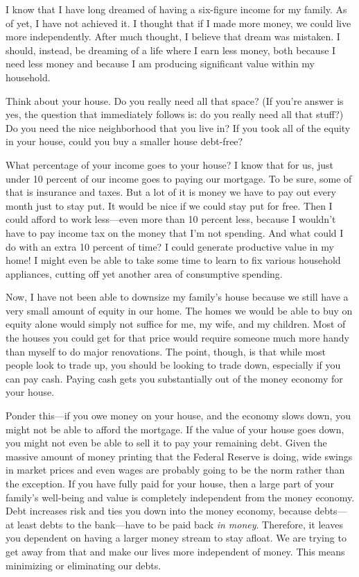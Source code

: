 I know that I have long dreamed of having a six-figure income for my
family. As of yet, I have not achieved it. I thought that if I made
more money, we could live more independently. After much thought, I
believe that dream was mistaken. I should, instead, be dreaming of a
life where I earn less money, both because I need less money and
because I am producing significant value within my household.

Think about your house. Do you really need all that space?
(If you’re answer is
yes, the question that immediately follows is: do you really need all
that stuff?) Do you need the nice neighborhood that you live in?  If
you took all of the equity in your house, could you buy a smaller house
debt-free?

What percentage of your income goes to your house?  I know that for us,
just under 10 percent of our income goes to paying our mortgage. To be
sure, some of that is insurance and taxes. But a lot of it is money we
have to pay out every month just to stay put. It would be nice if we
could stay put for free. Then I could afford to work less---even more
than 10 percent less, because I wouldn’t have to pay income tax on the
money that I’m not spending. And what could I do with an extra 10
percent of time? I could generate productive value in my home! I might
even be able to take some time to learn to fix various household
appliances, cutting off yet another area of consumptive spending. 

Now, I have not been able to downsize my family's house
because we still have a very small amount of equity in our home. The
homes we would be able to buy on equity alone would simply not suffice
for me, my wife, and my children. Most of the houses you could get for
that price would require someone much more handy than myself to do
major renovations. The point, though, is that while most people look to
trade up, you should be looking to trade down, especially if you can
pay cash. Paying cash gets you substantially out of the money economy
for your house.

Ponder this---if you owe money on your house, and the economy slows down,
you might not be able to afford the mortgage. If the value of your
house goes down, you might not even be able to sell it to pay your
remaining debt. Given the massive amount of money printing that the
Federal Reserve is doing, wide swings in market prices and even wages are probably
going to be the norm rather than the exception. If you have fully paid
for your house, then a large part of your family’s well-being and value
is completely independent from the money economy. Debt increases risk
and ties you down into the money economy, because debts---at least debts
to the bank---have to be paid back \textit{in money}.  Therefore, it
leaves you dependent on having a larger money stream to stay afloat.  We are
trying to get away from that and make our lives more independent of
money.  This means minimizing or eliminating our debts.

